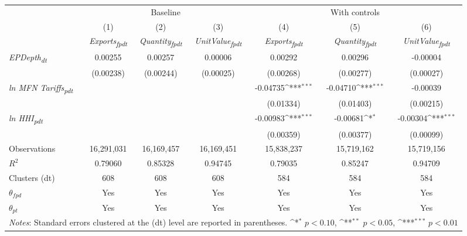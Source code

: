{
\def\sym#1{\ifmmode^{#1}\else\(^{#1}\)\fi}
\begin{tabular}{l*{6}{c}}
\toprule
&\multicolumn{3}{c}{Baseline}&\multicolumn{3}{c}{With controls}\\\cmidrule(lr){2-4}\cmidrule(lr){5-7}
&(1)&(2)&(3)&(4)&(5)&(6)\\
&\textit{Exports\textsubscript{fpdt}}&\textit{Quantity\textsubscript{fpdt}}&\textit{UnitValue\textsubscript{fpdt}}&\textit{Exports\textsubscript{fpdt}}&\textit{Quantity\textsubscript{fpdt}}&\textit{UnitValue\textsubscript{fpdt}}\\
\midrule
\textit{EPDepth\textsubscript{dt}} & 0.00255 & 0.00257 & 0.00006 & 0.00292 & 0.00296 & -0.00004\\
 & (0.00238) & (0.00244) & (0.00025) & (0.00268) & (0.00277) & (0.00027)\\
\addlinespace
\textit{ln MFN Tariffs\textsubscript{pdt}} &  &  &  & -0.04735\sym{***} & -0.04710\sym{***} & -0.00039\\
 &  &  &  & (0.01334) & (0.01403) & (0.00215)\\
\addlinespace
\textit{ln HHI\textsubscript{pdt}} &  &  &  & -0.00983\sym{***} & -0.00681\sym{*} & -0.00304\sym{***}\\
 &  &  &  & (0.00359) & (0.00377) & (0.00099)\\
\midrule
Observations & 16,291,031 & 16,169,457 & 16,169,451 & 15,838,237 & 15,719,162 & 15,719,156\\
$R^{2}$ & 0.79060 & 0.85328 & 0.94745 & 0.79035 & 0.85247 & 0.94709\\
Clusters (dt) & 608 & 608 & 608 & 584 & 584 & 584\\
$\theta_{fpd}$ & Yes & Yes & Yes & Yes & Yes & Yes\\
$\theta_{pt}$ & Yes & Yes & Yes & Yes & Yes & Yes\\
\bottomrule
\multicolumn{7}{l}{\footnotesize \textit{Notes}: Standard errors clustered at the (dt) level are reported in parentheses. \sym{*} \(p<0.10\), \sym{**} \(p<0.05\), \sym{***} \(p<0.01\)}\\
\end{tabular}
}
